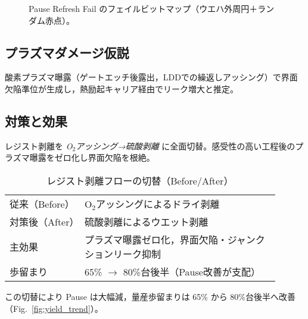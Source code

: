 \documentclass[conference]{IEEEtran}
\begin{document}
\begin{figure}[t]\centering
{}
\caption{Pause Refresh Fail のフェイルビットマップ（ウエハ外周円＋ランダム赤点）。}
\label{fig:failmap}
\end{figure}

\subsection{プラズマダメージ仮説}
酸素プラズマ曝露（ゲートエッチ後露出，LDDでの繰返しアッシング）で界面欠陥準位が生成し，熱励起キャリア経由でリーク増大と推定。

\subsection{対策と効果}
レジスト剥離を \emph{O$_2$アッシング→硫酸剥離} に全面切替。感受性の高い工程後のプラズマ曝露をゼロ化し界面欠陥を根絶。
\begin{table}[t]
  \centering
  \caption{レジスト剥離フローの切替（Before/After）}
  \label{tab:resist_flow}
  \begin{tabular}{p{0.25\linewidth} p{0.65\linewidth}}
    \toprule
    従来（Before） & O$_2$アッシングによるドライ剥離 \\
    対策後（After） & 硫酸剥離によるウエット剥離 \\
    主効果 & プラズマ曝露ゼロ化，界面欠陥・ジャンクションリーク抑制 \\
    歩留まり & 65\% $\rightarrow$ 80\%台後半（Pause改善が支配） \\
    \bottomrule
  \end{tabular}
\end{table}

この切替により Pause は大幅減，量産歩留まりは 65\% から 80\%台後半へ改善（Fig.~\ref{fig:yield_trend}）。
\end{document}
